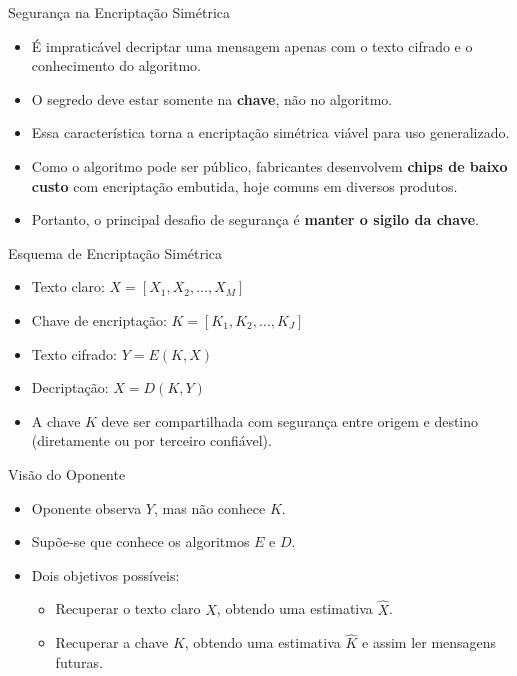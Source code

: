 \begin{frame}{Segurança na Encriptação Simétrica}
    \begin{itemize}
        \item É impraticável decriptar uma mensagem apenas com o texto cifrado e o conhecimento do algoritmo.
        \item O segredo deve estar somente na \textbf{chave}, não no algoritmo.
        \item Essa característica torna a encriptação simétrica viável para uso generalizado.
        \item Como o algoritmo pode ser público, fabricantes desenvolvem \textbf{chips de baixo custo} com encriptação embutida, hoje comuns em diversos produtos.
        \item Portanto, o principal desafio de segurança é \textbf{manter o sigilo da chave}.
    \end{itemize}
\end{frame}

\begin{frame}{Esquema de Encriptação Simétrica}
    \begin{itemize}
        \item Texto claro: $X = [X_1, X_2, \ldots, X_M]$ 
        \item Chave de encriptação: $K = [K_1, K_2, \ldots, K_J]$
        \item Texto cifrado: $Y = E(K, X)$
        \item Decriptação: $X = D(K, Y)$
        \item A chave $K$ deve ser compartilhada com segurança entre origem e destino (diretamente ou por terceiro confiável).
    \end{itemize}


    \begin{block}{Visão do Oponente}
    \begin{itemize}
        \item Oponente observa $Y$, mas não conhece $K$.
        \item Supõe-se que conhece os algoritmos $E$ e $D$.
        \item Dois objetivos possíveis:
        \begin{itemize}
            \item Recuperar o texto claro $X$, obtendo uma estimativa $\hat{X}$.
            \item Recuperar a chave $K$, obtendo uma estimativa $\hat{K}$ e assim ler mensagens futuras.
        \end{itemize}
    \end{itemize}
\end{block}
\end{frame}


